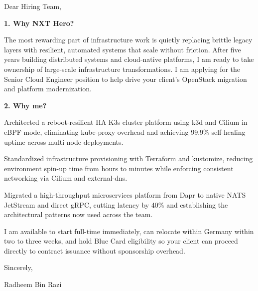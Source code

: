 \documentclass[11pt,a4paper]{coverletter}
\begin{document}

\opening{Dear Hiring Team,}

\vspace{8pt}\noindent\textbf{1. Why NXT Hero?}\par\vspace{3pt}

The most rewarding part of infrastructure work is quietly replacing brittle legacy layers with resilient, automated systems that scale without friction. After five years building distributed systems and cloud-native platforms, I am ready to take ownership of large-scale infrastructure transformations. I am applying for the Senior Cloud Engineer position to help drive your client’s OpenStack migration and platform modernization.

\vspace{8pt}\noindent\textbf{2. Why me?}\par\vspace{3pt}

\bullets

  \item Architected a reboot-resilient HA K3s cluster platform using k3d and Cilium in eBPF mode, eliminating kube-proxy overhead and achieving 99.9\% self-healing uptime across multi-node deployments.

  \item Standardized infrastructure provisioning with Terraform and kustomize, reducing environment spin-up time from hours to minutes while enforcing consistent networking via Cilium and external-dns.

  \item Migrated a high-throughput microservices platform from Dapr to native NATS JetStream and direct gRPC, cutting latency by 40\% and establishing the architectural patterns now used across the team.

\bulletsend

I am available to start full-time immediately, can relocate within Germany within two to three weeks, and hold Blue Card eligibility so your client can proceed directly to contract issuance without sponsorship overhead.

\closing{Sincerely,}{Radheem Bin Razi}

\clearpage
{}

\end{document}
